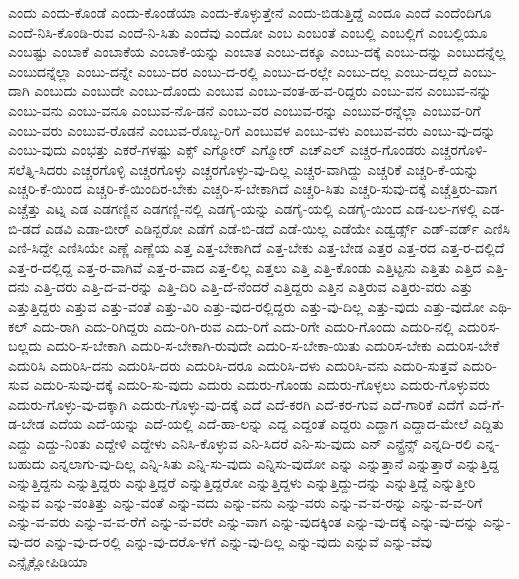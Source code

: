 {ಎಂದು
ಎಂದು-ಕೊಂಡೆ
ಎಂದು-ಕೊಂಡೆಯಾ
ಎಂದು-ಕೊಳ್ಳುತ್ತೇನೆ
ಎಂದು-ಬಿಡುತ್ತಿದ್ದೆ
ಎಂದೂ
ಎಂದೆ
ಎಂದೆಂದಿಗೂ
ಎಂದೆ-ನಿಸಿ-ಕೊಂಡಿ-ರುವ
ಎಂದೆ-ನಿ-ಸಿತು
ಎಂದೆವು
ಎಂದೋ
ಎಂಬ
ಎಂಬಂತೆ
ಎಂಬಲ್ಲಿ
ಎಂಬಲ್ಲಿಗೆ
ಎಂಬಲ್ಲಿಯೂ
ಎಂಬಷ್ಟು
ಎಂಬಾಕೆ
ಎಂಬಾಕೆಯ
ಎಂಬಾಕೆ-ಯನ್ನು
ಎಂಬಾತ
ಎಂಬು-ದಕ್ಕೂ
ಎಂಬು-ದಕ್ಕೆ
ಎಂಬು-ದನ್ನು
ಎಂಬುದನ್ನೆಲ್ಲ
ಎಂಬುದನ್ನೆಲ್ಲಾ
ಎಂಬು-ದನ್ನೇ
ಎಂಬು-ದರ
ಎಂಬು-ದ-ರಲ್ಲಿ
ಎಂಬು-ದ-ರಲ್ಲೇ
ಎಂಬು-ದಲ್ಲ
ಎಂಬು-ದಲ್ಲದೆ
ಎಂಬು-ದಾಗಿ
ಎಂಬುದು
ಎಂಬುದೇ
ಎಂಬು-ದೊಂದು
ಎಂಬುವ
ಎಂಬು-ವಂತ-ಹ-ವ-ರಿದ್ದರು
ಎಂಬು-ವನ
ಎಂಬುವ-ನನ್ನು
ಎಂಬು-ವನು
ಎಂಬು-ವನೂ
ಎಂಬುವ-ನೊ-ಡನೆ
ಎಂಬು-ವರ
ಎಂಬುವ-ರನ್ನು
ಎಂಬುವ-ರನ್ನೆಲ್ಲಾ
ಎಂಬುವ-ರಿಗೆ
ಎಂಬು-ವರು
ಎಂಬುವ-ರೊಡನೆ
ಎಂಬುವ-ರೊಬ್ಬ-ರಿಗೆ
ಎಂಬುವಳ
ಎಂಬು-ವಳು
ಎಂಬುವ-ವರು
ಎಂಬು-ವು-ದನ್ನು
ಎಂಬು-ವುದು
ಎಂಭತ್ತು
ಎಕರೆ-ಗಳಷ್ಟು
ಎಕ್ಸ್
ಎಗ್ಮೋರ್
ಎಗ್ಮೋರ್
ಎಚ್ಎಲ್
ಎಚ್ಚರ-ಗೊಂಡರು
ಎಚ್ಚರಗೊಳಿ-ಸಲೆತ್ನಿ-ಸಿದರು
ಎಚ್ಚರಗೊಳ್ಳಿ
ಎಚ್ಚರಗೊಳ್ಳು
ಎಚ್ಚರಗೊಳ್ಳು-ವು-ದಿಲ್ಲ
ಎಚ್ಚರ-ವಾಗಿದ್ದು
ಎಚ್ಚರಿಕೆ
ಎಚ್ಚರಿ-ಕೆ-ಯನ್ನು
ಎಚ್ಚರಿ-ಕೆ-ಯಿಂದ
ಎಚ್ಚರಿ-ಕೆ-ಯಿಂದಿರ-ಬೇಕು
ಎಚ್ಚರಿ-ಸ-ಬೇಕಾಗಿದೆ
ಎಚ್ಚರಿ-ಸಿತು
ಎಚ್ಚರಿ-ಸುವು-ದಕ್ಕೆ
ಎಚ್ಚೆತ್ತಿರು-ವಾಗ
ಎಚ್ಚೆತ್ತು
ಎಟ್ನ
ಎಡ
ಎಡಗಣ್ಣಿನ
ಎಡಗಣ್ಣಿ-ನಲ್ಲಿ
ಎಡಗೈ-ಯನ್ನು
ಎಡಗೈ-ಯಲ್ಲಿ
ಎಡಗೈ-ಯಿಂದ
ಎಡ-ಬಲ-ಗಳಲ್ಲಿ
ಎಡ-ಬಿ-ಡದೆ
ಎಡವಿ
ಎಡಾ-ಬೀರ್
ಎಡಿನ್ಬರೋ
ಎಡೆಗೆ
ಎಡೆ-ಬಿ-ಡದೆ
ಎಡೆ-ಯಿಲ್ಲ
ಎಡೆಯೇ
ಎಡ್ವರ್ಡ್ಸ್
ಎಡ್-ವರ್ಡ್
ಎಣಿಸಿ
ಎಣಿ-ಸಿದ್ದೇ
ಎಣಿಸಿಯೇ
ಎಣ್ಣೆ
ಎಣ್ಣೆಯ
ಎತ್ತ
ಎತ್ತ-ಬೇಕಾಗಿದೆ
ಎತ್ತ-ಬೇಕು
ಎತ್ತ-ಬೇಡ
ಎತ್ತರ
ಎತ್ತ-ರದ
ಎತ್ತ-ರ-ದಲ್ಲಿದೆ
ಎತ್ತ-ರ-ದಲ್ಲಿದ್ದ
ಎತ್ತ-ರ-ವಾಗಿವೆ
ಎತ್ತ-ರ-ವಾದ
ಎತ್ತ-ಲಿಲ್ಲ
ಎತ್ತಲು
ಎತ್ತಿ
ಎತ್ತಿ-ಕೊಂಡು
ಎತ್ತಿಟ್ಟನು
ಎತ್ತಿತು
ಎತ್ತಿದ
ಎತ್ತಿ-ದನು
ಎತ್ತಿ-ದರು
ಎತ್ತಿ-ದ-ವ-ರನ್ನು
ಎತ್ತಿ-ದಿರಿ
ಎತ್ತಿ-ದೆ-ನೆಂದರೆ
ಎತ್ತಿದ್ದರು
ಎತ್ತಿನ
ಎತ್ತಿರುವ
ಎತ್ತಿರು-ವರು
ಎತ್ತು
ಎತ್ತುತ್ತಿದ್ದರು
ಎತ್ತುವ
ಎತ್ತು-ವಂತೆ
ಎತ್ತು-ವಿರಿ
ಎತ್ತು-ವುದ-ರಲ್ಲಿದ್ದರು
ಎತ್ತು-ವು-ದಿಲ್ಲ
ಎತ್ತು-ವುದು
ಎತ್ತು-ವುದೋ
ಎಥಿ-ಕಲ್
ಎದು-ರಾಗಿ
ಎದು-ರಿಗಿದ್ದರು
ಎದು-ರಿಗಿ-ರುವ
ಎದು-ರಿಗೆ
ಎದು-ರಿಗೇ
ಎದುರಿ-ಗೊಂದು
ಎದುರಿ-ನಲ್ಲಿ
ಎದುರಿಸ-ಬಲ್ಲದು
ಎದುರಿ-ಸ-ಬೇಕಾಗಿ
ಎದುರಿ-ಸ-ಬೇಕಾಗಿ-ರುವುದೇ
ಎದುರಿ-ಸ-ಬೇಕಾ-ಯಿತು
ಎದುರಿಸ-ಬೇಕು
ಎದುರಿಸ-ಬೇಕೆ
ಎದುರಿಸಿ
ಎದುರಿಸಿ-ದನು
ಎದುರಿಸಿ-ದರು
ಎದುರಿಸಿ-ದರೂ
ಎದುರಿಸಿ-ದಳು
ಎದುರಿಸಿ-ವನು
ಎದುರಿ-ಸುತ್ತವೆ
ಎದುರಿ-ಸುವ
ಎದುರಿ-ಸುವು-ದಕ್ಕೆ
ಎದುರಿ-ಸು-ವುದು
ಎದುರು
ಎದುರು-ಗೊಂಡು
ಎದುರು-ಗೊಳ್ಳಲು
ಎದುರು-ಗೊಳ್ಳುವರು
ಎದುರು-ಗೊಳ್ಳು-ವು-ದಕ್ಕಾಗಿ
ಎದುರು-ಗೊಳ್ಳು-ವು-ದಕ್ಕೆ
ಎದೆ
ಎದೆ-ಕರಗಿ
ಎದೆ-ಕರ-ಗುವ
ಎದೆ-ಗಾರಿಕೆ
ಎದೆಗೆ
ಎದೆ-ಗೆ-ಡ-ಬೇಡ
ಎದೆಯ
ಎದೆ-ಯನ್ನು
ಎದೆ-ಯಲ್ಲಿ
ಎದೆ-ಹಾ-ಲನ್ನು
ಎದ್ದ
ಎದ್ದಂತೆ
ಎದ್ದರು
ಎದ್ದಾಗ
ಎದ್ದಾದ-ಮೇಲೆ
ಎದ್ದಿತು
ಎದ್ದು
ಎದ್ದು-ನಿಂತು
ಎದ್ದೇಳಿ
ಎದ್ದೇಳು
ಎನಿಸಿ-ಕೊಳ್ಳುವ
ಎನಿ-ಸಿದರೆ
ಎನಿ-ಸು-ವುದು
ಎನ್
ಎನ್ಟ್ರೆನ್ಸ್
ಎನ್ನದಿ-ರಲಿ
ಎನ್ನ-ಬಹುದು
ಎನ್ನಲಾಗು-ವು-ದಿಲ್ಲ
ಎನ್ನಿ-ಸಿತು
ಎನ್ನಿ-ಸು-ವುದು
ಎನ್ನಿಸು-ವುದೋ
ಎನ್ನು
ಎನ್ನುತ್ತಾನೆ
ಎನ್ನುತ್ತಾರೆ
ಎನ್ನುತ್ತಿದ್ದ
ಎನ್ನುತ್ತಿದ್ದನು
ಎನ್ನುತ್ತಿದ್ದರು
ಎನ್ನುತ್ತಿದ್ದರೆ
ಎನ್ನುತ್ತಿದ್ದರೋ
ಎನ್ನುತ್ತಿದ್ದಳು
ಎನ್ನುತ್ತಿದ್ದು-ದನ್ನು
ಎನ್ನುತ್ತಿದ್ದೆ
ಎನ್ನುತ್ತೀರಿ
ಎನ್ನುವ
ಎನ್ನು-ವಂತಿತ್ತು
ಎನ್ನು-ವಂತೆ
ಎನ್ನು-ವದು
ಎನ್ನು-ವನು
ಎನ್ನು-ವರು
ಎನ್ನು-ವ-ವ-ರನ್ನು
ಎನ್ನು-ವ-ವ-ರಿಗೆ
ಎನ್ನು-ವ-ವರು
ಎನ್ನು-ವ-ವ-ರೆಗೆ
ಎನ್ನು-ವ-ವರೇ
ಎನ್ನು-ವಾಗ
ಎನ್ನು-ವುದಕ್ಕಿಂತ
ಎನ್ನು-ವು-ದಕ್ಕೆ
ಎನ್ನು-ವು-ದನ್ನು
ಎನ್ನು-ವು-ದರ
ಎನ್ನು-ವು-ದ-ರಲ್ಲಿ
ಎನ್ನು-ವು-ದರೊ-ಳಗೆ
ಎನ್ನು-ವು-ದಿಲ್ಲ
ಎನ್ನು-ವುದು
ಎನ್ನುವೆ
ಎನ್ನು-ವೆವು
ಎನ್ಸೈಕ್ಲೋಪಿಡಿಯಾ
}
